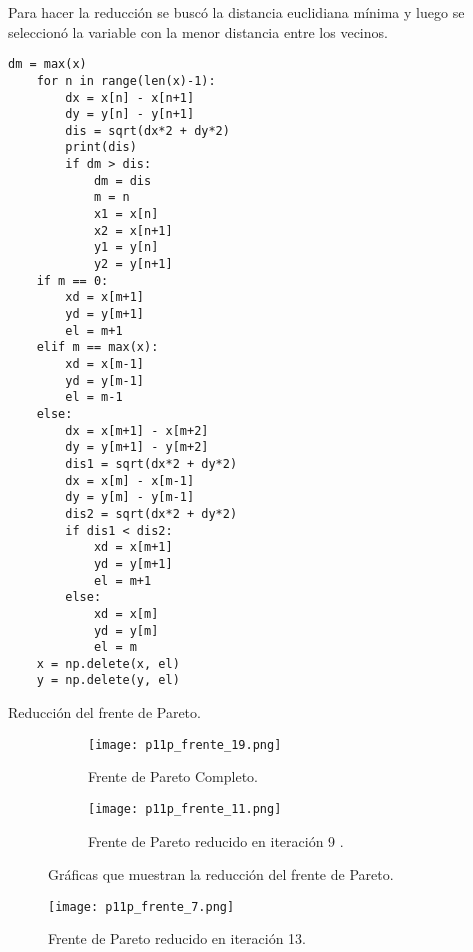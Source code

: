 \documentclass{article}
\begin{document}
Para hacer la reducción se buscó la distancia euclidiana mínima y luego se seleccionó la variable con la menor distancia entre los vecinos.

\renewcommand{\listingscaption}{Código}
\begin{listing}[H]
  \begin{verbatim}
dm = max(x)
    for n in range(len(x)-1):
        dx = x[n] - x[n+1]
        dy = y[n] - y[n+1]
        dis = sqrt(dx*2 + dy*2)
        print(dis)
        if dm > dis:
            dm = dis
            m = n
            x1 = x[n]
            x2 = x[n+1]
            y1 = y[n]
            y2 = y[n+1]
    if m == 0:
        xd = x[m+1]
        yd = y[m+1]
        el = m+1
    elif m == max(x):
        xd = x[m-1]
        yd = y[m-1]
        el = m-1
    else:
        dx = x[m+1] - x[m+2]
        dy = y[m+1] - y[m+2]
        dis1 = sqrt(dx*2 + dy*2)
        dx = x[m] - x[m-1]
        dy = y[m] - y[m-1]
        dis2 = sqrt(dx*2 + dy*2)
        if dis1 < dis2:
            xd = x[m+1]
            yd = y[m+1]
            el = m+1
        else:
            xd = x[m]
            yd = y[m]
            el = m
    x = np.delete(x, el)
    y = np.delete(y, el)
      \end{verbatim}
  \label{lst:fibo}
  \caption{Reducción del frente de Pareto.}
\end{listing}



\begin{figure}[H]
\centering
\begin{subfigure}[b]{0.40\linewidth}
\texttt{[image: p11p\_frente\_19.png]}
\caption{Frente de Pareto Completo.}
\end{subfigure}
\begin{subfigure}[b]{0.40\linewidth}
\texttt{[image: p11p\_frente\_11.png]}
\caption{Frente de Pareto reducido en iteración 9 .}
\end{subfigure}
\caption{Gráficas que muestran la reducción del frente de Pareto.}
\label{fig:westminster}
\end{figure}

\begin{figure}[H]
\centering
\texttt{[image: p11p\_frente\_7.png]}
\caption{\label{fig3} Frente de Pareto reducido en iteración 13.}
\end{figure}

\printbibliography
\end{document}

